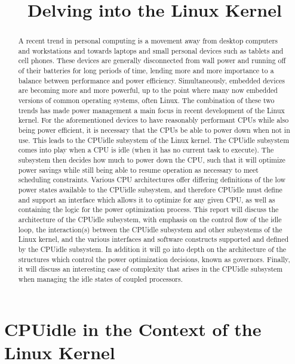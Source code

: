 \documentclass[10pt,preprint]{sigplanconf}
\date{}
\begin{document}
\title{Delving into the Linux Kernel} 
\maketitle

\begin{abstract}

A recent trend in personal computing is a movement away from desktop computers and workstations and towards laptops and small personal devices such as tablets and cell phones. These devices are generally disconnected from wall power and running off of their batteries for long periods of time, lending more and more importance to a balance between performance and power efficiency. Simultaneously, embedded devices are becoming more and more powerful, up to the point where many now embedded versions of common operating systems, often Linux. The combination of these two trends has made power management a main focus in recent development of the Linux kernel. For the aforementioned devices to have reasonably performant CPUs while also being power efficient, it is necessary that the CPUs be able to power down when not in use. This leads to the CPUidle subsystem of the Linux kernel. The CPUidle subsystem comes into play when a CPU is idle (when it has no current task to execute). The subsystem then decides how much to power down the CPU, such that it will optimize power savings while still being able to resume operation as necessary to meet scheduling constraints. Various CPU architectures offer differing definitions of the low power states available to the CPUidle subsystem, and therefore CPUidle must define and support an interface which allows it to optimize for any given CPU, as well as containing the logic for the power optimization process. This report will discuss the architecture of the CPUidle subsystem, with emphasis on the control flow of the idle loop, the interaction(s) between the CPUidle subsystem and other subsystems of the Linux kernel, and the various interfaces and software constructs supported and defined by the CPUidle subsystem. In addition it will go into depth on the architecture of the structures which control the power optimization decisions, known as governors. Finally, it will discuss an interesting case of complexity that arises in the CPUidle subsystem when managing the idle states of coupled processors.

\end{abstract}

\section{CPUidle in the Context of the Linux Kernel}
\end{document}
